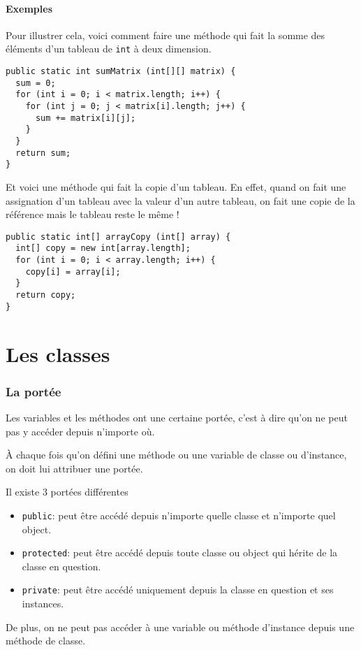 \subsection{Exemples}
Pour illustrer cela, voici comment faire une méthode qui fait la somme des
éléments d'un tableau de \verb|int| à deux dimension.
\begin{lstlisting}
public static int sumMatrix (int[][] matrix) {
  sum = 0;
  for (int i = 0; i < matrix.length; i++) {
    for (int j = 0; j < matrix[i].length; j++) {
      sum += matrix[i][j];
    }
  }
  return sum;
}
\end{lstlisting}

Et voici une méthode qui fait la copie d'un tableau.
En effet, quand on fait une assignation d'un tableau avec la valeur d'un autre
tableau, on fait une copie de la référence mais le tableau reste le même !
\begin{lstlisting}
public static int[] arrayCopy (int[] array) {
  int[] copy = new int[array.length];
  for (int i = 0; i < array.length; i++) {
    copy[i] = array[i];
  }
  return copy;
}
\end{lstlisting}

\part{Les classes}
\section{La portée}
Les variables et les méthodes ont une certaine portée, c'est à dire
qu'on ne peut pas y accéder depuis n'importe où.

À chaque fois qu'on défini une méthode ou une variable de classe ou
d'instance, on doit lui attribuer une portée.

Il existe 3 portées différentes
\begin{itemize}
  \item \verb|public|: peut être accédé depuis n'importe quelle
    classe et n'importe quel object.
  \item \verb|protected|: peut être accédé depuis toute classe ou object
    qui hérite de la classe en question.
  \item \verb|private|: peut être accédé uniquement depuis la classe
    en question et ses instances.
\end{itemize}

De plus, on ne peut pas accéder à une variable ou méthode d'instance
depuis une méthode de classe.

